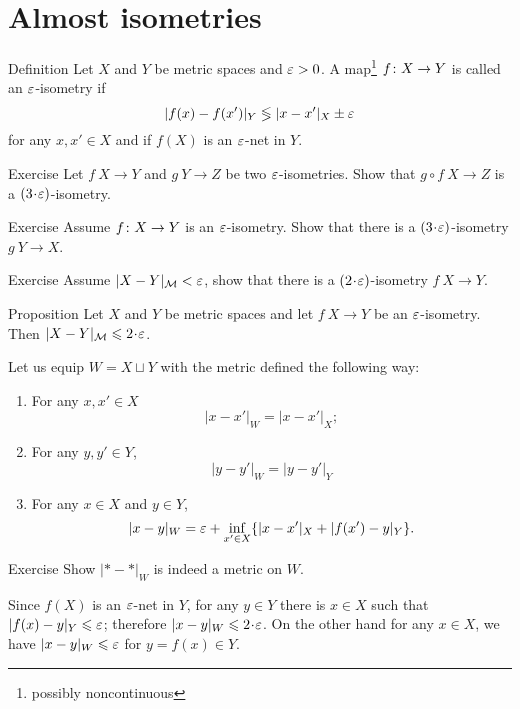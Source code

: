 \section{Almost isometries}\label{sec:alm-isom}

\begin{thm}{Definition} Let $X$ and $Y$ be metric spaces and $\varepsilon > 0$. 
A  map\footnote{possibly noncontinuous} $f\: X \z\to Y$ is called an $\varepsilon$-isometry 
if 
$$|f(x)-f(x')|_Y\lege |x-x'|_X\pm\eps$$
for any $x,x'\in X$ 
and if $f(X)$ is an $\varepsilon$-net in $Y$.
\end{thm}

\begin{thm}{Exercise}\label{ex:alm-isom:compositon}
Let $f\:X\to Y$ and $g\:Y\to Z$ be two $\varepsilon$-isometries.
Show that $g\circ f\: X\to Z$ is a $(3\cdot\eps)$-isometry.
\end{thm}


\begin{thm}{Exercise}\label{ex:alm-isom:inverse}
 Assume $f\: X \z\to Y$ is an $\varepsilon$-isometry.
Show that there is a $(3\cdot\eps)$-isometry 
$g\: Y\to X$.
\end{thm}

\begin{thm}{Exercise}\label{ex:GH=>eps-isom}
Assume $|X-Y|_{\mathcal{M}}<\varepsilon$, show that there is a $(2\cdot\eps)$-isometry 
$f\: X\to Y$.
\end{thm}

\begin{thm}{Proposition}\label{prop:alm-isom=>GH}
Let $X$ and $Y$ be metric spaces 
and let $f\: X\to Y$ be an $\varepsilon$-isometry.
Then $|X-Y|_{\mathcal{M}}\le 2\cdot \eps$.
\end{thm}

 Let us equip $W=X\sqcup Y$ with the metric defined the following way:
\begin{enumerate}
\item  For any $x,x'\in X$
$$|x-x'|_W=|x-x'|_X;$$
\item For any $y,y'\in Y$,
$$|y-y'|_W=|y-y'|_Y$$
\item For any $x\in X$ and $y\in Y$,
$$|x-y|_W=\varepsilon+\inf_{x'\in X}\{|x-x'|_X+|f(x')-y|_Y\}.$$
\end{enumerate}

\begin{thm}{Exercise}\label{ex:alm-isom=>GH}
 Show $|{*}-{*}|_W$ is indeed a metric on $W$.
\end{thm}

Since $f(X)$ is an $\varepsilon$-net in $Y$,
for any $y\in Y$ there is $x\in X$ such that $|f(x)-y|_Y\z\le\eps$;
therefore $|x-y|_W\le 2\cdot\eps$.
On the other hand for any $x\in X$, we have $|x-y|_W\leqslant\varepsilon$
for $y=f(x)\in Y$.

